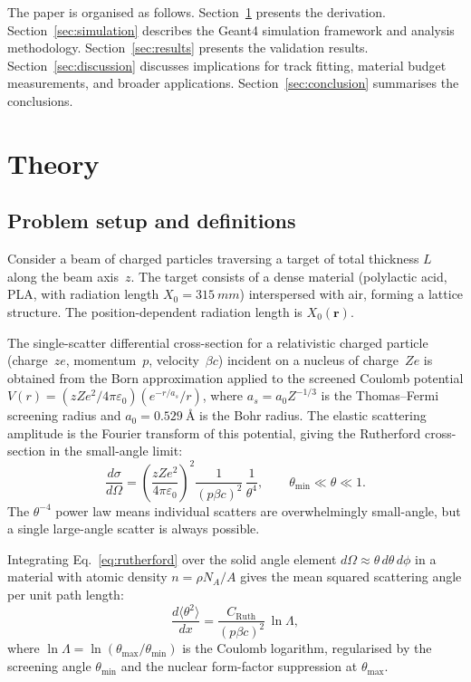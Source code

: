 \documentclass[final,5p,times,twocolumn]{elsarticle}
\begin{document}
The paper is organised as follows.  Section~\ref{sec:theory} presents the derivation.  Section~\ref{sec:simulation} describes the Geant4 simulation framework and analysis methodology.  Section~\ref{sec:results} presents the validation results.  Section~\ref{sec:discussion} discusses implications for track fitting, material budget measurements, and broader applications.  Section~\ref{sec:conclusion} summarises the conclusions.

\section{Theory}
\label{sec:theory}

\subsection{Problem setup and definitions}
\label{sec:setup}

Consider a beam of charged particles traversing a target of total thickness $L$ along the beam axis~$z$.  The target consists of a dense material (polylactic acid, PLA, with radiation length $X_0 = \SI{315}{mm}$) interspersed with air, forming a lattice structure.  The position-dependent radiation length is $X_0(\mathbf{r})$.

The single-scatter differential cross-section for a relativistic charged particle (charge~$ze$, momentum~$p$, velocity~$\beta c$) incident on a nucleus of charge~$Ze$ is obtained from the Born approximation applied to the screened Coulomb potential $V(r) = (zZe^2/4\pi\varepsilon_0)(e^{-r/a_s}/r)$, where $a_s = a_0 Z^{-1/3}$ is the Thomas--Fermi screening radius and $a_0 = \SI{0.529}{\angstrom}$ is the Bohr radius.  The elastic scattering amplitude is the Fourier transform of this potential, giving the Rutherford cross-section in the small-angle limit:
\begin{equation}
  \frac{d\sigma}{d\Omega} = \left(\frac{zZe^2}{4\pi\varepsilon_0}\right)^{\!2}\frac{1}{(p\beta c)^2}\,\frac{1}{\theta^4},
  \qquad \theta_{\min}\ll\theta\ll 1.
  \label{eq:rutherford}
\end{equation}
The $\theta^{-4}$ power law means individual scatters are overwhelmingly small-angle, but a single large-angle scatter is always possible.

Integrating Eq.~\eqref{eq:rutherford} over the solid angle element $d\Omega \approx \theta\,d\theta\,d\phi$ in a material with atomic density $n = \rho N_A/A$ gives the mean squared scattering angle per unit path length:
\begin{equation}
  \frac{d\langle\theta^2\rangle}{dx} = \frac{C_{\mathrm{Ruth}}}{(p\beta c)^2}\,\ln\Lambda,
  \label{eq:dtheta2dx}
\end{equation}
where $\ln\Lambda = \ln(\theta_{\max}/\theta_{\min})$ is the Coulomb logarithm, regularised by the screening angle $\theta_{\min}$ and the nuclear form-factor suppression at $\theta_{\max}$.
\end{document}
